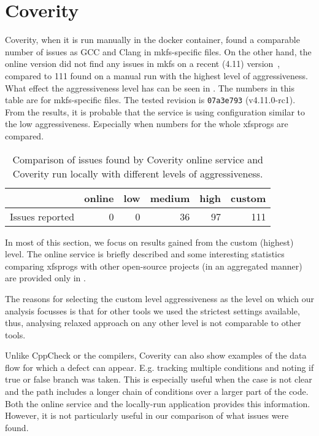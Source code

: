 \section{Coverity}\label{chap:results:coverity}

Coverity, when it is run manually in the docker container, found a comparable
number of issues as GCC and Clang in mkfs-specific files. On the other hand,
the online version did not find any issues in mkfs on a recent (4.11)
version~\cite{CoverityXfsprogs}, compared to 111 found on a manual run with the
highest level of aggressiveness. What effect the aggressiveness level has can
be seen in . The numbers in this table are
for mkfs-specific files. The tested revision is {\tt 07a3e793} (v4.11.0-rc1).
From the results, it is probable that the service is using configuration similar
to the low aggressiveness.  Especially when numbers for the whole xfsprogs are
compared.


\begin{table}[h]
\begin{tabular}{|l||r|r|r|r|r|}
\hline
& online & low & medium & high & custom \\
\hline
Issues reported & 0 & 0 & 36 & 97 & 111 \\
\hline
\end{tabular}
\caption{Comparison of issues found by Coverity online service and Coverity run
locally with different levels of aggressiveness.}
\label{tab:results:coverity:levels}
\end{table}

In most of this section, we focus on results gained from the custom (highest)
level. The online service is briefly described and some interesting statistics
comparing xfsprogs with other open-source projects (in an aggregated manner)
are provided only in .

The reasons for selecting the custom level aggressiveness as the level on which
our analysis focusses is that for other tools we used the strictest settings
available, thus, analysing relaxed approach on any other level is not
comparable to other tools.

Unlike CppCheck or the compilers, Coverity can also show examples of the data
flow for which a defect can appear.  E.g. tracking multiple conditions and
noting if true or false branch was taken. This is especially useful when the
case is not clear and the path includes a longer chain of conditions over a
larger part of the code. Both the online service and the locally-run
application provides this information. However, it is not particularly useful
in our comparison of what issues were found.

